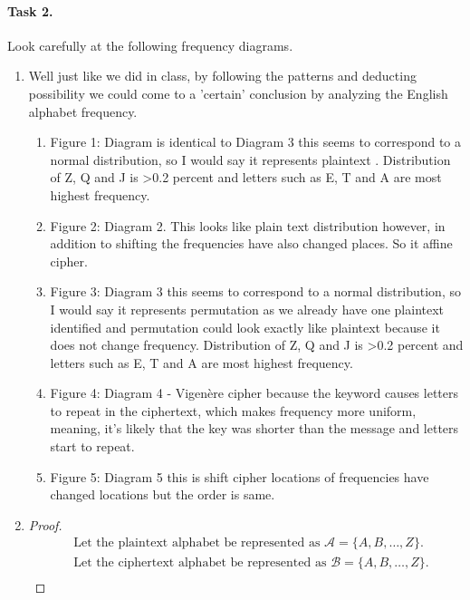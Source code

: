 \documentclass{article}
\begin{document}
\paragraph{Task 2.} Look carefully at the following frequency diagrams.
\begin{enumerate}
    \item Well just like we did in class, by following the patterns and deducting possibility we could come to a 'certain' conclusion by
    analyzing the English alphabet frequency.
    \begin{enumerate}
            \item Figure 1: Diagram is identical to Diagram 3 this seems to correspond to a normal distribution, so I would say it
            represents plaintext .
            Distribution
            of Z, Q and J is >0.2 percent and letters such as E, T and A are most highest frequency.
            \item Figure 2: Diagram 2.
            This looks like plain text distribution however, in addition to shifting the frequencies have also
            changed places.
            So it affine cipher.
      \item Figure 3: Diagram 3 this seems to correspond to a normal distribution, so I would say it represents permutation as we already
            have one plaintext identified and permutation could look exactly like plaintext because it does not change frequency.
            Distribution
            of Z, Q and J is >0.2 percent and letters such as E, T and A are most highest frequency.
      \item Figure 4: Diagram 4 -  Vigenère cipher because the keyword causes letters to repeat in the ciphertext, which makes frequency
            more uniform, meaning, it's likely that the key was shorter than the message and letters start to repeat.
      \item Figure 5: Diagram 5 this is shift cipher locations of
            frequencies have changed locations but the order is same.
    \end{enumerate}
    \item
    \begin{minipage}{\linewidth}
          \begin{proof}
            \begin{align*}
              &\text{Let the plaintext alphabet be represented as } \mathcal{A} = \{A, B, \ldots, Z\}. \\
              &\text{Let the ciphertext alphabet be represented as } \mathcal{B} = \{A, B, \ldots, Z\}. \\

\end{align*}
\end{proof}
\end{minipage}
\end{enumerate}
\end{document}
